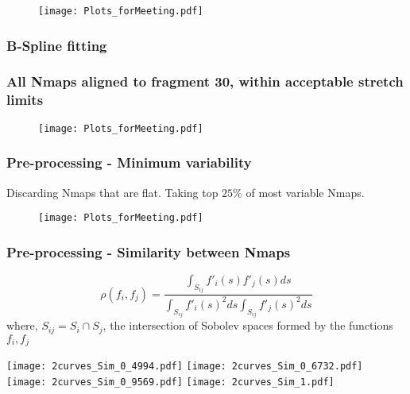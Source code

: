 \documentclass[10pt,dvipsnames,table]{beamer}
\begin{document}
\begin{frame}
\begin{figure}
\texttt{[image: Plots\_forMeeting.pdf]}
\end{figure}
\end{frame}

\begin{frame}
\frametitle{B-Spline fitting}

\end{frame}

\begin{frame}
\frametitle{All Nmaps aligned to fragment 30, within acceptable stretch limits}
\begin{figure}
\texttt{[image: Plots\_forMeeting.pdf]}
\end{figure}
\end{frame}

\begin{frame}
\frametitle{Pre-processing - Minimum variability}
Discarding Nmaps that are flat. Taking top $25\%$ of most variable Nmaps.
\begin{figure}
\texttt{[image: Plots\_forMeeting.pdf]}
\end{figure}
\end{frame}

\begin{frame}
\frametitle{Pre-processing - Similarity between Nmaps }
\[ \rho(f_i, f_j) = \frac{\int _{S_{ij}}f'_i(s)f'_j(s) ds}{\int _{S_{ij}}f'_i(s)^2 ds \int _{S_{ij}}f'_j(s)^2 ds} \]
where, $S_{ij} = S_i \cap S_j$, the intersection of Sobolev spaces formed by the functions $f_i, f_j$


\end{frame}

\begin{frame}
\begin{center}
\texttt{[image: 2curves\_Sim\_0\_4994.pdf]}
\texttt{[image: 2curves\_Sim\_0\_6732.pdf]} \\
\texttt{[image: 2curves\_Sim\_0\_9569.pdf]}
\texttt{[image: 2curves\_Sim\_1.pdf]}
\end{center}
\end{frame}
\end{document}
